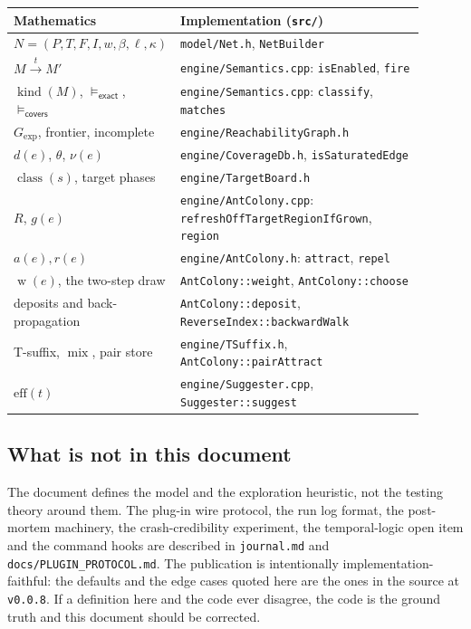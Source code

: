 \documentclass[11pt,a4paper]{article}
\newcommand{\Off}{R}
\newcommand{\kind}{\operatorname{kind}}
\newcommand{\cls}{\operatorname{class}}
\newcommand{\mix}{\operatorname{mix}}
\newcommand{\wgt}{\operatorname{w}}
\newcommand{\fir}[1]{\xrightarrow{#1}}
\begin{document}
\begin{center}
\small
\begin{tabular}{@{}p{0.28\linewidth}p{0.62\linewidth}@{}}
\toprule
Mathematics & Implementation (\texttt{src/}) \\
\midrule
$N=(P,T,F,I,w,\beta,\ell,\kappa)$ & \texttt{model/Net.h}, \texttt{NetBuilder} \\
$M\fir{t}M'$ & \texttt{engine/Semantics.cpp}: \texttt{isEnabled}, \texttt{fire} \\
$\kind(M)$, $\models_{\mathsf{exact}}$, $\models_{\mathsf{covers}}$ &
\texttt{engine/Semantics.cpp}: \texttt{classify}, \texttt{matches} \\
$G_{\mathrm{exp}}$, frontier, incomplete &
\texttt{engine/ReachabilityGraph.h} \\
$d(e)$, $\theta$, $\nu(e)$ & \texttt{engine/CoverageDb.h},
\texttt{isSaturatedEdge} \\
$\cls(s)$, target phases & \texttt{engine/TargetBoard.h} \\
$\Off$, $g(e)$ & \texttt{engine/AntColony.cpp}:
\texttt{refreshOffTargetRegionIfGrown}, \texttt{region} \\
$a(e),r(e)$ & \texttt{engine/AntColony.h}: \texttt{attract}, \texttt{repel} \\
$\wgt(e)$, the two-step draw & \texttt{AntColony::weight}, \texttt{AntColony::choose} \\
deposits and back-propagation & \texttt{AntColony::deposit},
\texttt{ReverseIndex::backwardWalk} \\
T-suffix, $\mix$, pair store & \texttt{engine/TSuffix.h},
\texttt{AntColony::pairAttract} \\
$\mathrm{eff}(t)$ & \texttt{engine/Suggester.cpp}, \texttt{Suggester::suggest} \\
\bottomrule
\end{tabular}
\end{center}

\subsection{What is not in this document}

The document defines the model and the exploration heuristic, not the testing
theory around them.  The plug-in wire protocol, the run log format, the
post-mortem machinery, the crash-credibility experiment, the temporal-logic
open item and the command hooks are described in \texttt{journal.md} and
\texttt{docs/PLUGIN\_PROTOCOL.md}.  The publication is intentionally
implementation-faithful: the defaults and the edge cases quoted here are the
ones in the source at \texttt{v0.0.8}.  If a definition here and the code ever
disagree, the code is the ground truth and this document should be corrected.
\end{document}

